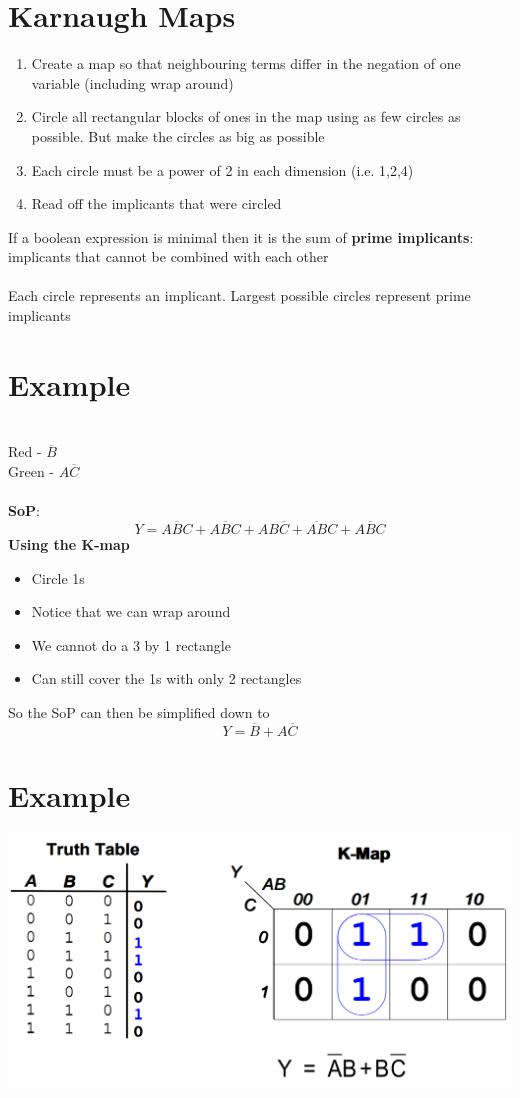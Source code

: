 \documentclass{article}[18pt]
\begin{document}
\section{Karnaugh Maps}
\begin{enumerate}
	\item Create a map so that neighbouring terms differ in the negation of one variable (including wrap around)
	\item Circle all rectangular blocks of ones in the map using as few circles as possible. But make the circles as big as possible
	\item Each circle must be a power of 2 in each dimension (i.e. 1,2,4)
	\item Read off the implicants that were circled
\end{enumerate}
If a boolean expression is minimal then it is the sum of \textbf{prime implicants}: implicants that cannot be combined with each other\\
\\
Each circle represents an implicant. Largest possible circles represent prime implicants
\section{Example}
\begin{karnaugh-map}[4][2][1][AB][C]
	\autoterms[0]
\end{karnaugh-map}\\
Red - $\overline{B}$\\
Green - $A\overline{C}$\\
\\
\textbf{SoP}:
$$Y=\overline{ABC}+A\overline{B}C+AB\overline{C}+\overline{AB}C+A\overline{B}C$$
\textbf{Using the K-map}
\begin{itemize}
	\item Circle 1s
	\item Notice that we can wrap around
	\item We cannot do a 3 by 1 rectangle
	\item Can still cover the 1s with only 2 rectangles
\end{itemize}
So the SoP can then be simplified down to
$$Y=\overline{B}+A\overline{C}$$
\section{Example}
\begin{center}
	\includegraphics[scale=0.4]{karnaughex1}
\end{center}
\end{document}
